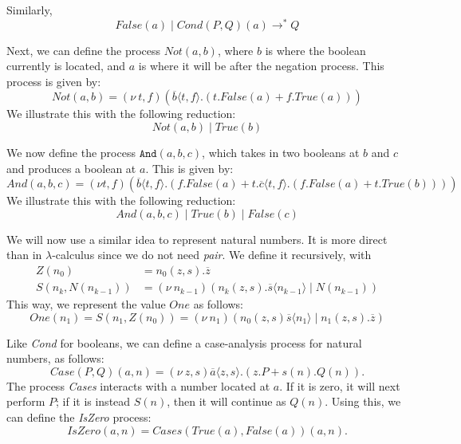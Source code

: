 \documentclass[a4paper, openany]{memoir}
\theoremstyle{definition}
\begin{document}
    Similarly,
    \[\textit{False}(a) \mid \textit{Cond}(P, Q)(a) \to^* Q\]

    Next, we can define the process $\textit{Not}(a, b)$, where $b$ is where the boolean currently is located, and $a$ is where it will be after the negation process. This process is given by:
    \[\textit{Not}(a, b) = (\nu \ t, f)(\overline{b} \langle t, f \rangle.(
        t.\textit{False}(a) + f.\textit{True}(a)
    ))\]
    We illustrate this with the following reduction:
    \[\textit{Not}(a, b) \mid \textit{True}(b)\]

    We now define the process $\texttt{And}(a, b, c)$, which takes in two booleans at $b$ and $c$ and produces a boolean at $a$. This is given by:
    \[\textit{And}(a, b, c) = (\nu t, f)(\overline{b} \langle t, f \rangle.(
        f.\textit{False}(a) + t.\overline{c} \langle t, f \rangle.(
            f.\textit{False}(a) + t.\textit{True}(b)
        )
    ))\]
    We illustrate this with the following reduction:
    \[\textit{And}(a, b, c) \mid \textit{True}(b) \mid \textit{False}(c)\]

    We will now use a similar idea to represent natural numbers. It is more direct than in $\lambda$-calculus since we do not need \textit{pair}. We define it recursively, with
    \begin{align*}
        Z(n_0) &= n_0(z, s).\overline{z} \\
        S(n_k, N(n_{k-1})) &= (\nu \ n_{k-1})(n_k(z, s).\overline{s} \langle n_{k-1} \rangle \mid N(n_{k-1}))
    \end{align*}
    This way, we represent the value $\textit{One}$ as follows:
    \[\textit{One}(n_1) = S(n_1, Z(n_0)) = (\nu \ n_1)(n_0(z, s) \overline{s} \langle n_1 \rangle \mid n_1(z, s).\overline{z})\]
    
    Like \textit{Cond} for booleans, we can define a case-analysis process for natural numbers, as follows:
    \[\textit{Case}(P, Q)(a, n) = (\nu \ z, s)\overline{a} \langle z, s \rangle.(z.P + s(n).Q(n)).\]
    The process \textit{Cases} interacts with a number located at $a$. If it is zero, it will next perform $P$; if it is instead $S(n)$, then it will continue as $Q(n)$. Using this, we can define the \textit{IsZero} process:
    \[\textit{IsZero}(a, n) = \textit{Cases}(\textit{True}(a), \textit{False}(a))(a, n).\]
\end{document}
